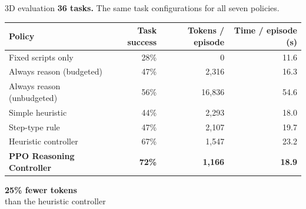 \documentclass[aspectratio=169]{beamer}
\begin{document}
\begin{frame}{3D evaluation}
  \textbf{36 tasks.} The same task configurations for all seven policies.

  \bigskip
  \begin{center}
    \renewcommand{\arraystretch}{1.10}
    \setlength{\tabcolsep}{4pt}
    \begin{tabular}{@{}lrrr@{}}
      \hline
      \textbf{Policy} & \textbf{Task success} & \textbf{Tokens / episode} & \textbf{Time / episode (s)} \\
      \hline
      Fixed scripts only & 28\% & 0 & 11.6 \\
      Always reason (budgeted) & 47\% & 2,316 & 16.3 \\
      Always reason (unbudgeted) & 56\% & 16,836 & 54.6 \\
      Simple heuristic & 44\% & 2,293 & 18.0 \\
      Step-type rule & 47\% & 2,107 & 19.7 \\
      Heuristic controller & 67\% & 1,547 & 23.2 \\
      \textbf{PPO Reasoning Controller} & \textbf{72\%} & \textbf{1,166} & \textbf{18.9} \\
      \hline
    \end{tabular}
  \end{center}

  \medskip
  \begin{center}
    {\Large\color{structure.fg}\textbf{25\% fewer tokens}}\\[4pt]
    than the heuristic controller
  \end{center}


\end{frame}
\end{document}
